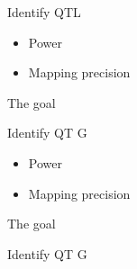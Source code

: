 \documentclass[12pt]{article}
\newcommand{\headsize}{\fontsize{35}{35} \selectfont}
\newcommand{\smallsize}{\fontsize{25}{30} \selectfont}
\begin{document}
{\hfill \begin{minipage}{9.5in}
Identify QTL
\end{minipage}

\vspace{15mm}

\hfill \begin{minipage}{9in}
\color{myblue}
\begin{itemize}
\itemsep24pt
\item Power
\item Mapping precision
\end{itemize}
\end{minipage}

\newpage

\addtocounter{page}{-1}

\headsize \color{myyellow}
\hfill \begin{minipage}{5.75in}
\centering
The goal
\end{minipage}

\vspace{25mm}

\color{mywhite}
\smallsize

\hfill \begin{minipage}{9.5in}
Identify QT{\color{mypink} G}
\end{minipage}

\vspace{15mm}

\hfill \begin{minipage}{9in}
\color{myblue}
\begin{itemize}
\itemsep24pt
\item Power
\item Mapping precision
\end{itemize}
\end{minipage}




\newpage

\addtocounter{page}{-1}

\headsize \color{myyellow}
\hfill \begin{minipage}{5.75in}
\centering
The goal
\end{minipage}

\vspace{25mm}

\color{mywhite}
\smallsize

\hfill \begin{minipage}{9.5in}
Identify QT{\color{mypink} G}
\end{minipage}

}
\end{document}
